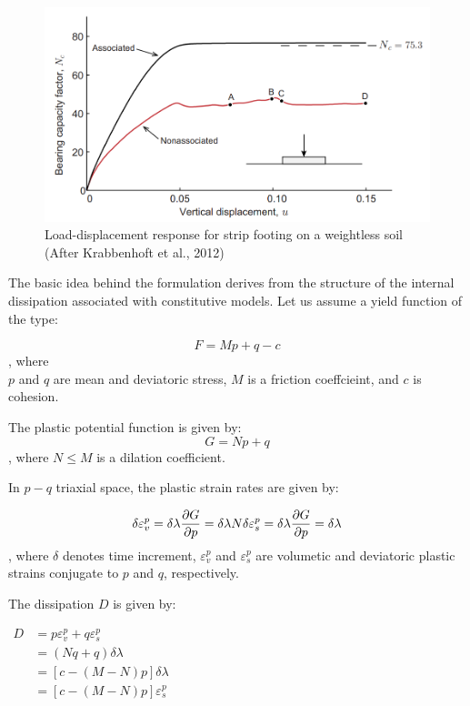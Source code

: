 \documentclass[a4paper, nobind]{templates/ociamthesis}
\begin{document}
\begin{figure}[H]
\includegraphics[width=1\linewidth]{myfigureeeeee/Load-displacement response for strip footing on a weightless soil} \caption{Load-displacement response for strip footing on a weightless soil (After  Krabbenhoft et al., 2012)}\label{fig:unnamed-chunk-2}
\end{figure}

The basic idea behind the formulation derives from the structure of the internal dissipation associated with constitutive models. Let us assume a yield function of the type:

\[
F = Mp+q-c
\]
, where\\
\(p\) and \(q\) are mean and deviatoric stress, \(M\) is a friction coeffcieint, and \(c\) is cohesion.

The plastic potential function is given by:\\
\[
G = Np +q
\]
, where \(N \leq M\) is a dilation coefficient.

In \(p-q\) triaxial space, the plastic strain rates are given by:

\[
\delta \varepsilon_v^{p} = \delta \lambda \frac{\partial G}{\partial p} = \delta \lambda N \\
\delta \varepsilon_s^{p} = \delta \lambda \frac{\partial G}{\partial p} = \delta \lambda
\]
, where
\(\delta\) denotes time increment, \(\varepsilon_v^{p}\) and \(\varepsilon_s^{p}\) are volumetic and deviatoric plastic strains conjugate to \(p\) and \(q\), respectively.

The dissipation \(D\) is given by:

\(\begin{aligned} D &= p \varepsilon_v^{p} + q \varepsilon_s^{p} \\  &= (Nq+q) \delta \lambda \\  &= [c-(M-N)p]\delta \lambda \\  &= [c - (M-N)p]\varepsilon_s^{p} \end{aligned}\)
\end{document}
